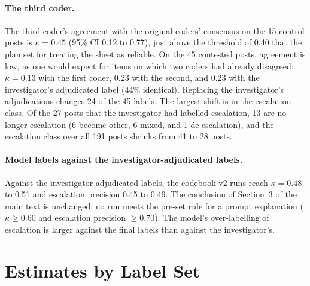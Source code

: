 \documentclass[11pt]{article}
\begin{document}
\paragraph{The third coder.} The third coder's agreement with the original coders' consensus on the 15 control posts is $\kappa = 0.45$ (95\% CI 0.12 to 0.77), just above the threshold of 0.40 that the plan set for treating the sheet as reliable. On the 45 contested posts, agreement is low, as one would expect for items on which two coders had already disagreed: $\kappa = 0.13$ with the first coder, 0.23 with the second, and 0.23 with the investigator's adjudicated label (44\% identical). Replacing the investigator's adjudications changes 24 of the 45 labels. The largest shift is in the escalation class. Of the 27 posts that the investigator had labelled escalation, 13 are no longer escalation (6 become other, 6 mixed, and 1 de-escalation), and the escalation class over all 191 posts shrinks from 41 to 28 posts.

\paragraph{Model labels against the investigator-adjudicated labels.} Against the investigator-adjudicated labels, the codebook-v2 runs reach $\kappa = 0.48$ to 0.51 and escalation precision 0.45 to 0.49. The conclusion of Section~3 of the main text is unchanged: no run meets the pre-set rule for a prompt explanation ($\kappa \geq 0.60$ and escalation precision $\geq 0.70$). The model's over-labelling of escalation is larger against the final labels than against the investigator's.

\section{Estimates by Label Set}
\label{sec:labelsets}
\end{document}
